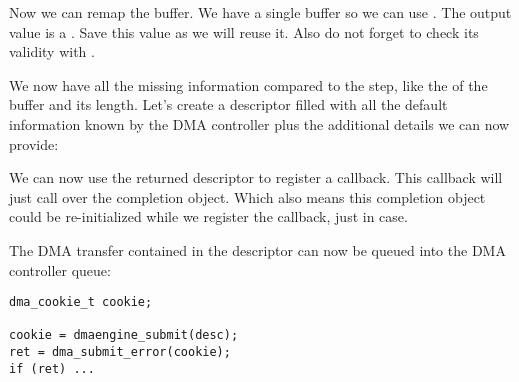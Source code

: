 Now we can remap the buffer. We have a single buffer so we can use
. The output value is a . Save this
value as we will reuse it. Also do not forget to check its validity with
.

We now have all the missing information compared to the 
step, like the  of the buffer and its length. Let's create a
descriptor filled with all the default information known by the DMA controller
plus the additional details we can now provide:

\if{}\fi
\if{}\fi
\if{}\fi

We can now use the returned descriptor to register a callback. This callback
will just call  over the completion object. Which also means
this completion object could be re-initialized while we register the callback,
just in case.

The DMA transfer contained in the descriptor can now be queued into the DMA
controller queue:

\begin{verbatim}
dma_cookie_t cookie;

cookie = dmaengine_submit(desc);
ret = dma_submit_error(cookie);
if (ret) ...
\end{verbatim}

